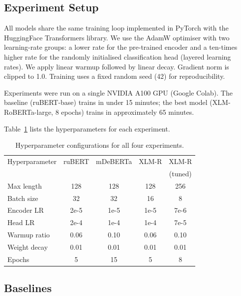 \documentclass{article}
\begin{document}
\subsection{Experiment Setup}

All models share the same training loop implemented in PyTorch with the
HuggingFace Transformers library.
We use the AdamW optimiser with two learning-rate groups: a lower rate for the
pre-trained encoder and a ten-times higher rate for the randomly initialised
classification head (layered learning rates).
We apply linear warmup followed by linear decay.
Gradient norm is clipped to 1.0.
Training uses a fixed random seed (42) for reproducibility.

Experiments were run on a single NVIDIA A100 GPU (Google Colab).
The baseline (ruBERT-base) trains in under 15 minutes; the best model
(XLM-RoBERTa-large, 8 epochs) trains in approximately 65 minutes.

Table~\ref{tab:hyperparams} lists the hyperparameters for each experiment.

\begin{table}[tbh!]
\begin{center}
\small
\begin{tabular}[t]{|l|cccc|}
\hline
Hyperparameter
  & ruBERT & mDeBERTa & XLM-R & XLM-R\\
  &        &          &       & (tuned) \\
\hline
Max length       & 128  & 128  & 128  & 256  \\
Batch size       & 32   & 32   & 16   & 8    \\
Encoder LR       & 2e-5 & 1e-5 & 1e-5 & 7e-6 \\
Head LR          & 2e-4 & 1e-4 & 1e-4 & 7e-5 \\
Warmup ratio     & 0.06 & 0.10 & 0.06 & 0.10 \\
Weight decay     & 0.01 & 0.01 & 0.01 & 0.01 \\
Epochs           & 5    & 15   & 5    & 8    \\
\hline
\end{tabular}
\caption{Hyperparameter configurations for all four experiments.}
\label{tab:hyperparams}
\end{center}
\end{table}

\subsection{Baselines}
\end{document}
